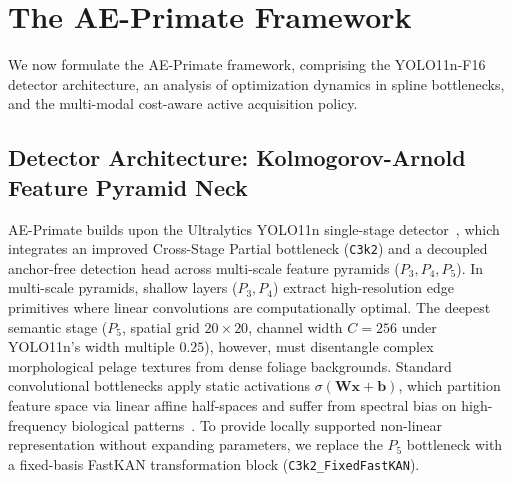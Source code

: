 \documentclass[conference]{IEEEtran}
\begin{document}
\section{The AE-Primate Framework}
\label{sec:method}

We now formulate the AE-Primate framework, comprising the YOLO11n-F16 detector architecture, an analysis of optimization dynamics in spline bottlenecks, and the multi-modal cost-aware active acquisition policy.

\subsection{Detector Architecture: Kolmogorov-Arnold Feature Pyramid Neck}
\label{sec:arch}
AE-Primate builds upon the Ultralytics YOLO11n single-stage detector~\cite{ultralytics2024}, which integrates an improved Cross-Stage Partial bottleneck (\texttt{C3k2}) and a decoupled anchor-free detection head across multi-scale feature pyramids ($P_3, P_4, P_5$). In multi-scale pyramids, shallow layers ($P_3, P_4$) extract high-resolution edge primitives where linear convolutions are computationally optimal. The deepest semantic stage ($P_5$, spatial grid $20 \times 20$, channel width $C=256$ under YOLO11n's width multiple $0.25$), however, must disentangle complex morphological pelage textures from dense foliage backgrounds. Standard convolutional bottlenecks apply static activations $\sigma(\mathbf{W}\mathbf{x} + \mathbf{b})$, which partition feature space via linear affine half-spaces and suffer from spectral bias on high-frequency biological patterns~\cite{rahaman2019spectral}. To provide locally supported non-linear representation without expanding parameters, we replace the $P_5$ bottleneck with a fixed-basis FastKAN transformation block (\texttt{C3k2\_FixedFastKAN}).
\end{document}
